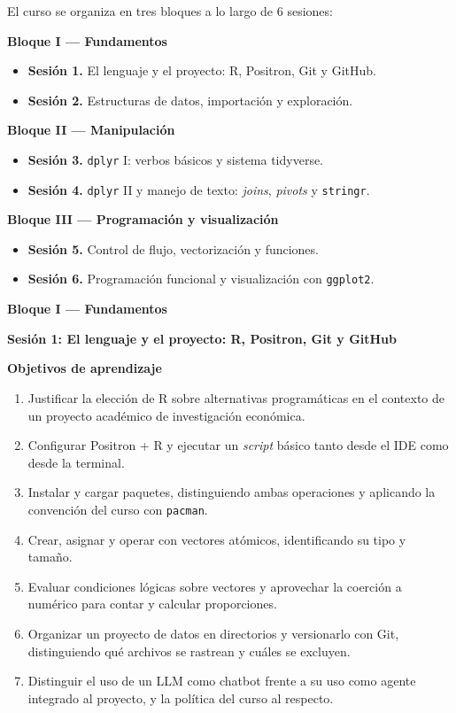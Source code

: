 \documentclass[11pt,letterpaper]{article}
\newcommand{\bloqueCurso}[1]{%
  \clearpage%
  \vspace*{0.5cm}%
  {\centering\color{main}\fontsize{26pt}{32pt}\selectfont\bfseries #1\par}%
  \vspace{0.8cm}%
}
\newcommand{\sesion}[2]{%
  \bigskip%
  {\color{main}\Large\bfseries Sesión #1: #2\par}%
  \smallskip%
}
\begin{document}
El curso se organiza en tres bloques a lo largo de 6 sesiones:

\smallskip
\noindent\textbf{\textcolor{main}{Bloque I --- Fundamentos}}
\begin{itemize}[leftmargin=*, itemsep=1pt]
    \item \textbf{Sesión 1.} El lenguaje y el proyecto: R, Positron, Git y GitHub.
    \item \textbf{Sesión 2.} Estructuras de datos, importación y exploración.
\end{itemize}

\smallskip
\noindent\textbf{\textcolor{main}{Bloque II --- Manipulación}}
\begin{itemize}[leftmargin=*, itemsep=1pt]
    \item \textbf{Sesión 3.} \texttt{dplyr} I: verbos básicos y sistema tidyverse.
    \item \textbf{Sesión 4.} \texttt{dplyr} II y manejo de texto: \textit{joins}, \textit{pivots} y \texttt{stringr}.
\end{itemize}

\smallskip
\noindent\textbf{\textcolor{main}{Bloque III --- Programación y visualización}}
\begin{itemize}[leftmargin=*, itemsep=1pt]
    \item \textbf{Sesión 5.} Control de flujo, vectorización y funciones.
    \item \textbf{Sesión 6.} Programación funcional y visualización con \texttt{ggplot2}.
\end{itemize}

\bloqueCurso{Bloque I --- Fundamentos}

\sesion{1}{El lenguaje y el proyecto: R, Positron, Git y GitHub}
\medskip
\noindent\textbf{Objetivos de aprendizaje}
\begin{enumerate}[leftmargin=*, itemsep=1pt]
    \item Justificar la elección de R sobre alternativas programáticas en el contexto de un proyecto académico de investigación económica.
    \item Configurar Positron + R y ejecutar un \textit{script} básico tanto desde el IDE como desde la terminal.
    \item Instalar y cargar paquetes, distinguiendo ambas operaciones y aplicando la convención del curso con \texttt{pacman}.
    \item Crear, asignar y operar con vectores atómicos, identificando su tipo y tamaño.
    \item Evaluar condiciones lógicas sobre vectores y aprovechar la coerción a numérico para contar y calcular proporciones.
    \item Organizar un proyecto de datos en directorios y versionarlo con Git, distinguiendo qué archivos se rastrean y cuáles se excluyen.
    \item Distinguir el uso de un LLM como chatbot frente a su uso como agente integrado al proyecto, y la política del curso al respecto.
\end{enumerate}
\end{document}
